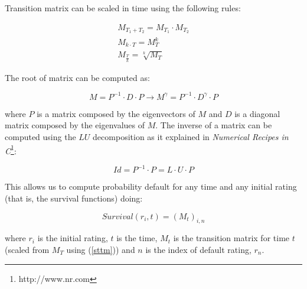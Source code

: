 \documentclass[a4paper,12pt,final]{article}
\begin{document}
Transition matrix can be scaled in time using the following rules:

\begin{equation}
\label{sttm}
\begin{array}{l}
M_{T_1+T_2} = M_{T_1} \cdot M_{T_2} \nonumber \\
M_{k \cdot T} = M_{T}^k \nonumber \\
M_{\frac{T}{k}} = \sqrt[k]{M_{T}} \nonumber
\end{array}
\end{equation}

The root of matrix can be computed as:

\begin{displaymath}
M = P^{-1} \cdot D \cdot P 
\longrightarrow
M^{\gamma} = P^{-1} \cdot D^{\gamma} \cdot P
\end{displaymath}

where $P$ is a matrix composed by the eigenvectors of $M$ and $D$ is a diagonal 
matrix composed by the eigenvalues of $M$. The inverse of a matrix can be 
computed using the $LU$ decomposition as it explained in \emph{Numerical 
Recipes in C}\footnote{http://www.nr.com}:

\begin{displaymath}
Id = P^{-1} \cdot P = L \cdot U \cdot P
\end{displaymath}

This allows us to compute probability default for any time and any initial rating
(that is, the survival functions) doing:

\begin{displaymath}
Survival(r_i, t) = \left( M_t \right)_{i, n}
\end{displaymath}

where $r_i$ is the initial rating, $t$ is the time, $M_t$ is the transition 
matrix for time $t$ (scaled from $M_T$ using (\ref{sttm})) and $n$ is the 
index of default rating, $r_n$.

\newpage


\end{document}
